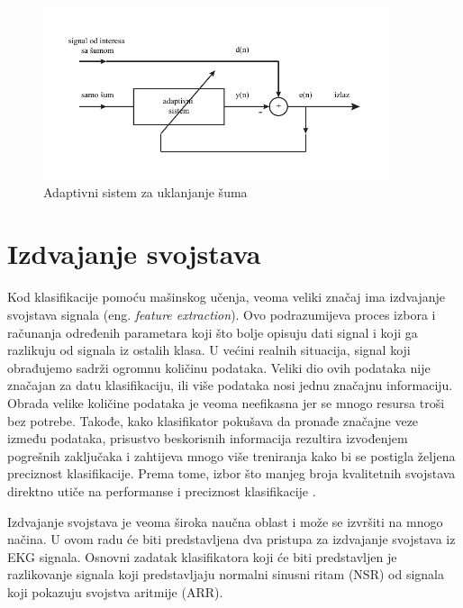 \documentclass[12pt]{SeminarskiADS}
\begin{document}
\begin{figure}[tbp]
\centering
\includegraphics[width=0.9\textwidth]{lms_denoise}
\caption{Adaptivni sistem za uklanjanje šuma}
\label{lms_denoise}
\end{figure}

\section{Izdvajanje svojstava}
\label{sec:extraction}
Kod klasifikacije pomoću mašinskog učenja, veoma veliki značaj ima izdvajanje svojstava signala (eng. \emph{feature extraction}). Ovo podrazumijeva proces izbora i računanja određenih parametara koji što bolje opisuju dati signal i koji ga razlikuju od signala iz ostalih klasa. U većini realnih situacija, signal koji obrađujemo sadrži ogromnu količinu podataka. Veliki dio ovih podataka nije značajan za datu klasifikaciju, ili više podataka nosi jednu značajnu informaciju. Obrada velike količine podataka je veoma neefikasna jer se mnogo resursa troši bez potrebe. Takođe, kako klasifikator pokušava da pronađe značajne veze između podataka, prisustvo beskorisnih informacija rezultira izvođenjem pogrešnih zaključaka i zahtijeva mnogo više treniranja kako bi se postigla željena preciznost klasifikacije. Prema tome, izbor što manjeg broja kvalitetnih svojstava direktno utiče na performanse i preciznost klasifikacije \cite{feat}. 

Izdvajanje svojstava je veoma široka naučna oblast i može se izvršiti na mnogo načina. U ovom radu će biti predstavljena dva pristupa za izdvajanje svojstava iz EKG signala. Osnovni zadatak klasifikatora koji će biti predstavljen je razlikovanje signala koji predstavljaju normalni sinusni ritam (NSR) od signala koji pokazuju svojstva aritmije (ARR).
\end{document}
